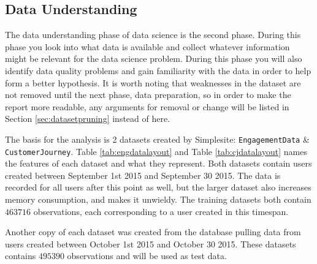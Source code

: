 \subsection{Data Understanding}


The data understanding phase of data science is the second phase. During this
phase you look into what data is available and collect whatever information
might be relevant for the data science problem. During this phase you will also
identify data quality problems and gain familiarity with the data in order to
help form a better hypothesis. It is worth noting that weaknesses in the dataset
are not removed until the next phase, data preparation, so in order to make the
report more readable, any arguments for removal or change will be listed in
Section \ref{sec:datasetpruning} instead of here.

The basis for the analysis is 2 datasets created by Simplesite:
\texttt{EngagementData} \& \texttt{CustomerJourney}. Table
\ref{tab:engdatalayout} and Table \ref{tab:cjdatalayout} names the features of
each dataset and what they represent. Both datasets contain users created
between September 1st 2015 and September 30 2015. The data is recorded for all
users after this point as well, but the larger dataset also increases memory
consumption, and makes it unwieldy. The training datasets both contain $463716$
observations, each corresponding to a user created in this timespan.

Another copy of each dataset was created from the database pulling data from
users created between October 1st 2015 and October 30 2015. These datasets
contains $495390$ observations and will be used as test data.

